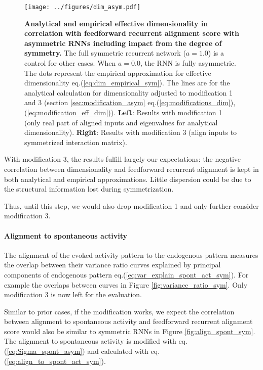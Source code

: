 \documentclass[11pt]{article}
\begin{document}
		\begin{figure}[H]
			\centering
			\texttt{[image: ../figures/dim\_asym.pdf]}
			\caption[Analytical and empirical effective dimensionality in correlation with feedforward recurrent alignment score with asymmetric RNNs including impact from the degree of symmetry]{\textbf{Analytical and empirical effective dimensionality in correlation with feedforward recurrent alignment score with asymmetric RNNs including impact from the degree of symmetry.} The full symmetric recurrent network ($a = 1.0$) is a control for other cases. When $a = 0.0$, the RNN is fully asymmetric. The dots represent the empirical approximation for effective dimensionality eq.(\ref{eq:dim_empirical_sym}). The lines are for the analytical calculation for dimensionality adjusted to modification 1 and 3 (section \ref{sec:modification_asym} eq.(\ref{eq:modifications_dim}), (\ref{eq:modification_eff_dim})). \textbf{Left}: Results with modification 1 (only real part of aligned inputs and eigenvalues for analytical dimensionality). \textbf{Right}: Results with modification 3 (align inputs to symmetrized interaction matrix).}
			\label{fig:dim_asym}
		\end{figure}
	
	With modification 3, the results fulfill largely our expectations: the negative correlation between dimensionality and feedforward recurrent alignment is kept in both analytical and empirical approximations. Little dispersion could be due to the structural information lost during symmetrization. 
	
	Thus, until this step, we would also drop modification 1 and only further consider modification 3. 
	
	\paragraph{Alignment to spontaneous activity}
	The alignment of the evoked activity pattern to the endogenous pattern measures the overlap between their variance ratio curves explained by principal components of endogenous pattern eq.(\ref{eq:var_explain_spont_act_sym}). For example the overlaps between curves in Figure \ref{fig:variance_ratio_sym}. Only modification 3 is now left for the evaluation. 
	
	Similar to prior cases, if the modification works, we expect the correlation between alignment to spontaneous activity and feedforward recurrent alignment score would also be similar to symmetric RNNs in Figure \ref{fig:align_spont_sym}. The alignment to spontaneous activity is modified with eq.(\ref{eq:Sigma_spont_asym}) and calculated with eq.(\ref{eq:align_to_spont_act_sym}). 
	
\end{document}
